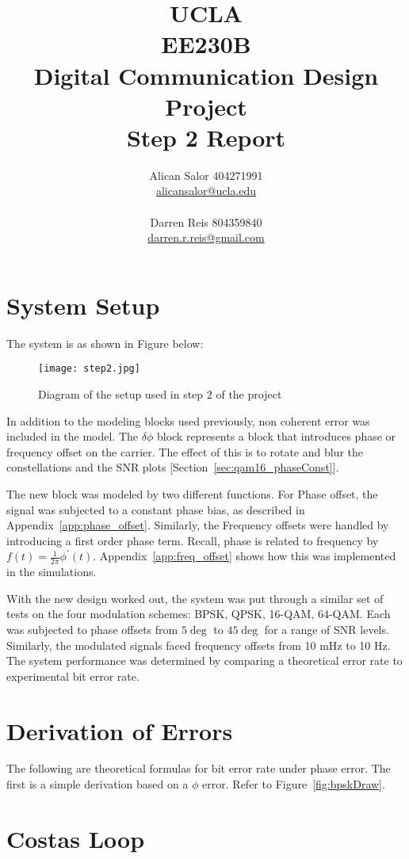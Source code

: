 \documentclass[]{article}
\title{UCLA\\EE230B\\Digital Communication Design Project\\Step 2 Report}
\author{Alican Salor 404271991 \\  \href{mailto:alicansalor@ucla.edu}{alicansalor@ucla.edu} \\ \\
Darren Reis 804359840 \\
\href{mailto:darrer.r.reis@gmail.com}{darren.r.reis@gmail.com} }
\begin{document}
\maketitle

\newpage
\tableofcontents

\newpage


\section{System Setup}
\label{sec:setup}
The system is as shown in Figure below:

\begin{figure}[H]
\centering
\texttt{[image: step2.jpg]}
\caption{Diagram of the setup used in step 2 of the project}
\end{figure}

In addition to the modeling blocks used previously, non coherent error was included in the model.  The $\delta\phi$ block represents a block that introduces phase or frequency offset on the carrier.  The effect of this is to rotate and blur the constellations and the SNR plots [Section~\ref{sec:qam16_phaseConst}].

The new block was modeled by two different functions.  For Phase offset, the signal was subjected to a constant phase bias, as described in Appendix~\ref{app:phase_offset}.  Similarly, the Frequency offsets were handled by introducing a first order phase term.  Recall, phase is related to frequency by $f(t) = \frac{1}{2 \pi} \phi^\prime(t)$.  Appendix~\ref{app:freq_offset} shows how this was implemented in the simulations.

With the new design worked out, the system was put through a similar set of tests on the four modulation schemes: BPSK, QPSK, 16-QAM, 64-QAM.  Each was subjected to phase offsets from $5\deg$ to $45\deg$ for a range of SNR levels.  Similarly, the modulated signals faced frequency offsets from 10 mHz to 10 Hz.  The system performance was determined by comparing a theoretical error rate to experimental bit error rate.  
\section{Derivation of Errors}
\label{sec:errors}
The following are theoretical formulas for bit error rate under phase error.  The first is a simple derivation based on a $\phi$ error.  Refer to Figure~\ref{fig:bpskDraw}.
\section{Costas Loop}
\label{sec:costas}
\end{document}
